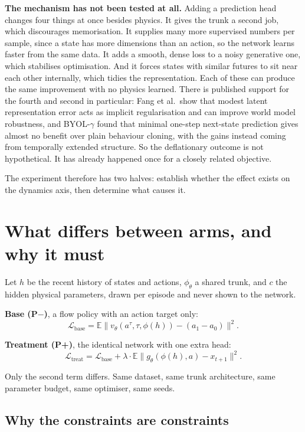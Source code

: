 \documentclass[9pt]{extarticle}
\begin{document}
\textbf{The mechanism has not been tested at all.} Adding a prediction head changes four things at once besides physics. It gives the trunk a second job, which discourages memorisation. It supplies many more supervised numbers per sample, since a state has more dimensions than an action, so the network learns faster from the same data. It adds a smooth, dense loss to a noisy generative one, which stabilises optimisation. And it forces states with similar futures to sit near each other internally, which tidies the representation. Each of these can produce the same improvement with no physics learned. There is published support for the fourth and second in particular: Fang et al.\ show that modest latent representation error acts as implicit regularisation and can improve world model robustness, and BYOL-$\gamma$ found that minimal one-step next-state prediction gives almost no benefit over plain behaviour cloning, with the gains instead coming from temporally extended structure. So the deflationary outcome is not hypothetical. It has already happened once for a closely related objective.

The experiment therefore has two halves: establish whether the effect exists on the dynamics axis, then determine what causes it.

\section{What differs between arms, and why it must}

Let $h$ be the recent history of states and actions, $\phi_\theta$ a shared trunk, and $c$ the hidden physical parameters, drawn per episode and never shown to the network.

\textbf{Base (P$-$)}, a flow policy with an action target only:
\[
\mathcal{L}_{\text{base}} = \mathbb{E}\big\| v_\theta(a^\tau, \tau, \phi(h)) - (a_1 - a_0) \big\|^2 .
\]

\textbf{Treatment (P+)}, the identical network with one extra head:
\[
\mathcal{L}_{\text{treat}} = \mathcal{L}_{\text{base}} + \lambda \cdot \mathbb{E}\big\| g_\theta(\phi(h), a) - x_{t+1} \big\|^2 .
\]

Only the second term differs. Same dataset, same trunk architecture, same parameter budget, same optimiser, same seeds.

\subsection{Why the constraints are constraints}
\end{document}

